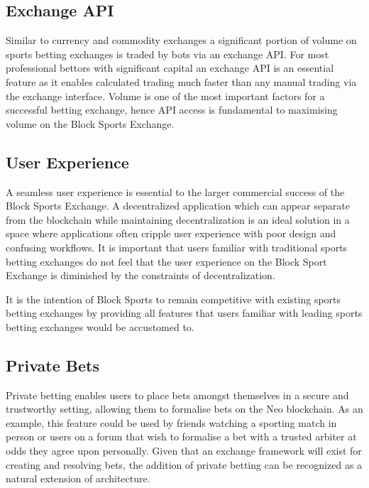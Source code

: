 \documentclass{article}
\begin{document}
	\subsection{Exchange API}
Similar to currency and commodity exchanges a significant portion of volume on sports betting exchanges is traded by bots via an exchange API. For most professional bettors with significant capital an exchange API is an essential feature as it enables calculated trading much faster than any manual trading via the exchange interface. Volume is one of the most important factors for a successful betting exchange, hence API access is fundamental to maximising volume on the Block Sports Exchange.

	\subsection{User Experience}
A seamless user experience is essential to the larger commercial success of the Block Sports Exchange. A decentralized application which can appear separate from the blockchain while maintaining decentralization is an ideal solution in a space where applications often cripple user experience with poor design and confusing workflows. It is important that users familiar with traditional sports betting exchanges do not feel that the user experience on the Block Sport Exchange is diminished by the constraints of decentralization.

It is the intention of Block Sports to remain competitive with existing sports betting exchanges by providing all features that users familiar with leading sports betting exchanges would be accustomed to.

	\subsection{Private Bets}
Private betting enables users to place bets amongst themselves in a secure and trustworthy setting, allowing them to formalise bets on the Neo blockchain. As an example, this feature could be used by friends watching a sporting match in person or users on a forum that wish to formalise a bet with a trusted arbiter at odds they agree upon personally. Given that an exchange framework will exist for creating and resolving bets, the addition of private betting can be recognized as a natural extension of architecture.
\end{document}
